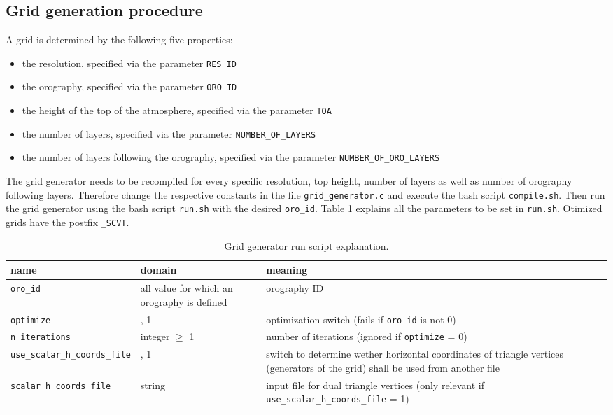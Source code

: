 \documentclass{article}
\begin{document}
\subsection{Grid generation procedure}
\label{sec:grid_generation_procedure}

A grid is determined by the following five properties:

\begin{itemize}
\item the resolution, specified via the parameter \texttt{RES\_ID}
\item the orography, specified via the parameter \texttt{ORO\_ID}
\item the height of the top of the atmosphere, specified via the parameter \texttt{TOA}
\item the number of layers, specified via the parameter \texttt{NUMBER\_OF\_LAYERS}
\item the number of layers following the orography, specified via the parameter \texttt{NUMBER\_OF\_ORO\_LAYERS}
\end{itemize}
%
The grid generator needs to be recompiled for every specific resolution, top height, number of layers as well as number of orography following layers. Therefore change the respective constants in the file \texttt{grid\_generator.c} and execute the bash script \texttt{compile.sh}. Then run the grid generator using the bash script \texttt{run.sh} with the desired \texttt{oro\_id}. Table \ref{tab:grid_generator_run_file_explanation} explains all the parameters to be set in \texttt{run.sh}. Otimized grids have the postfix \texttt{\_SCVT}.

\renewcommand{\arraystretch}{1.2}
\begin{table}
\centering
\begin{tabular}{|>{\centering}p{5.0 cm}|>{\centering}p{3 cm}|>{\centering}p{7 cm}|}
\hline \textbf{name} & \textbf{domain} & \textbf{meaning} \tabularnewline
\hline\hline \texttt{oro\_id} & all value for which an orography is defined & orography ID \tabularnewline
\hline\hline \texttt{optimize} & 0, 1 & optimization switch (fails if \texttt{oro\_id} is not 0) \tabularnewline
\hline\hline \texttt{n\_iterations} & integer $\geq$ 1 & number of iterations (ignored if \texttt{optimize} = 0) \tabularnewline
\hline\hline \texttt{use\_scalar\_h\_coords\_file} & 0, 1 & switch to determine wether horizontal coordinates of triangle vertices (generators of the grid) shall be used from another file \tabularnewline
\hline\hline \texttt{scalar\_h\_coords\_file} & string & input file for dual triangle vertices (only relevant if \texttt{use\_scalar\_h\_coords\_file} = 1) \tabularnewline
\hline
\end{tabular}
\caption{Grid generator run script explanation.}
\label{tab:grid_generator_run_file_explanation}
\end{table}
\renewcommand{\arraystretch}{1}
\end{document}
